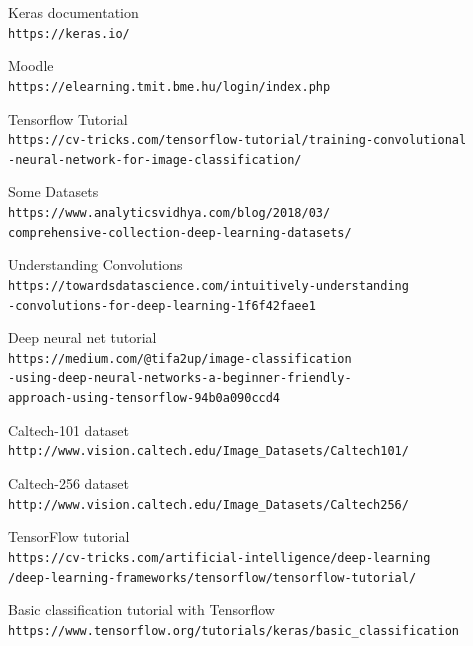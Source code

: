 \documentclass[12pt,english]{article}
\begin{document}
\begin{thebibliography}{9}

Keras documentation
\\\texttt{https://keras.io/}

Moodle
\\\texttt{https://elearning.tmit.bme.hu/login/index.php}

Tensorflow Tutorial
\\\texttt{https://cv-tricks.com/tensorflow-tutorial/training-convolutional\\-neural-network-for-image-classification/}

Some Datasets
\\\texttt{https://www.analyticsvidhya.com/blog/2018/03/\\comprehensive-collection-deep-learning-datasets/}


Understanding Convolutions
\\\texttt{https://towardsdatascience.com/intuitively-understanding\\-convolutions-for-deep-learning-1f6f42faee1}

Deep neural net tutorial
\\\texttt{https://medium.com/@tifa2up/image-classification\\-using-deep-neural-networks-a-beginner-friendly-\\approach-using-tensorflow-94b0a090ccd4}

Caltech-101 dataset
\\\texttt{http://www.vision.caltech.edu/Image\_Datasets/Caltech101/}


Caltech-256 dataset
\\\texttt{http://www.vision.caltech.edu/Image\_Datasets/Caltech256/}


TensorFlow tutorial
\\\texttt{https://cv-tricks.com/artificial-intelligence/deep-learning\\/deep-learning-frameworks/tensorflow/tensorflow-tutorial/}

Basic classification tutorial with Tensorflow
\\\texttt{https://www.tensorflow.org/tutorials/keras/basic\_classification}



\end{thebibliography}
\end{document}
